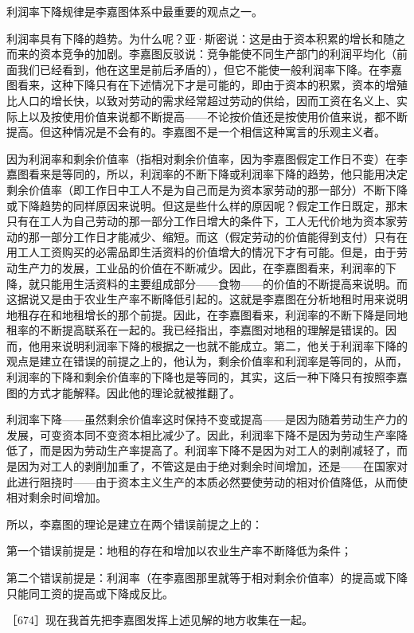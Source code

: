 利润率下降规律是李嘉图体系中最重要的观点之一。

利润率具有下降的趋势。为什么呢？亚·斯密说：这是由于资本积累的增长和随之而来的资本竞争的加剧。李嘉图反驳说：竞争能使不同生产部门的利润平均化（前面我们已经看到，他在这里是前后矛盾的），但它不能使一般利润率下降。在李嘉图看来，这种下降只有在下述情况下才是可能的，即由于资本的积累，资本的增殖比人口的增长快，以致对劳动的需求经常超过劳动的供给，因而工资在名义上、实际上以及按使用价值来说都不断提高——不论按价值还是按使用价值来说，都不断提高。但这种情况是不会有的。李嘉图不是一个相信这种寓言的乐观主义者。

因为利润率和剩余价值率（指相对剩余价值率，因为李嘉图假定工作日不变）在李嘉图看来是等同的，所以，利润率的不断下降或利润率下降的趋势，他只能用决定剩余价值率（即工作日中工人不是为自己而是为资本家劳动的那一部分）不断下降或下降趋势的同样原因来说明。但这是些什么样的原因呢？假定工作日既定，那末只有在工人为自己劳动的那一部分工作日增大的条件下，工人无代价地为资本家劳动的那一部分工作日才能减少、缩短。而这（假定劳动的价值能得到支付）只有在用工人工资购买的必需品即生活资料的价值增大的情况下才有可能。但是，由于劳动生产力的发展，工业品的价值在不断减少。因此，在李嘉图看来，利润率的下降，就只能用生活资料的主要组成部分——食物——的价值的不断提高来说明。而这据说又是由于农业生产率不断降低引起的。这就是李嘉图在分析地租时用来说明地租存在和地租增长的那个前提。因此，在李嘉图看来，利润率的不断下降是同地租率的不断提高联系在一起的。我已经指出，李嘉图对地租的理解是错误的。因而，他用来说明利润率下降的根据之一也就不能成立。第二，他关于利润率下降的观点是建立在错误的前提之上的，他认为，剩余价值率和利润率是等同的，从而，利润率的下降和剩余价值率的下降也是等同的，其实，这后一种下降只有按照李嘉图的方式才能解释。因此他的理论就被推翻了。

利润率下降——虽然剩余价值率这时保持不变或提高——是因为随着劳动生产力的发展，可变资本同不变资本相比减少了。因此，利润率下降不是因为劳动生产率降低了，而是因为劳动生产率提高了。利润率下降不是因为对工人的剥削减轻了，而是因为对工人的剥削加重了，不管这是由于绝对剩余时间增加，还是——在国家对此进行阻挠时——由于资本主义生产的本质必然要使劳动的相对价值降低，从而使相对剩余时间增加。

所以，李嘉图的理论是建立在两个错误前提之上的：

第一个错误前提是：地租的存在和增加以农业生产率不断降低为条件；

第二个错误前提是：利润率（在李嘉图那里就等于相对剩余价值率）的提高或下降只能同工资的提高或下降成反比。

［674］现在我首先把李嘉图发挥上述见解的地方收集在一起。

